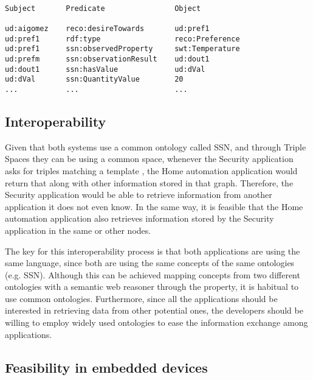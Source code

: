 \begin{lstlisting}[label=lst:home-automation,caption=Sample triples stored by the Home Automation application.]

Subject       Predicate                Object

ud:aigomez    reco:desireTowards       ud:pref1
ud:pref1      rdf:type                 reco:Preference
ud:pref1      ssn:observedProperty     swt:Temperature
ud:prefm      ssn:observationResult    ud:dout1
ud:dout1      ssn:hasValue             ud:dVal
ud:dVal       ssn:QuantityValue        20
...           ...                      ...
\end{lstlisting}


\subsection{Interoperability}

\begin{sloppypar}
Given that both systems use a common ontology called SSN, and through Triple Spaces they can be using a common space,
whenever the Security application asks for triples matching a template , the Home
automation application would return that  along with other information
stored in that graph. Therefore, the Security application would be able to retrieve information from another application
it does not even know. In the same way, it is feasible that the Home automation application also retrieves information
stored by the Security application in the same or other nodes.
\end{sloppypar}

The key for this interoperability process is that both applications are using the same language, since both are using
the same concepts of the same ontologies (e.g. SSN). Although this can be achieved mapping concepts from two different
ontologies with a semantic web reasoner through the  property, it is habitual to use common
ontologies. Furthermore, since all the applications should be interested in retrieving data from other potential ones,
the developers should be willing to employ widely used ontologies to ease the information exchange among applications.

\subsection{Feasibility in embedded devices}


